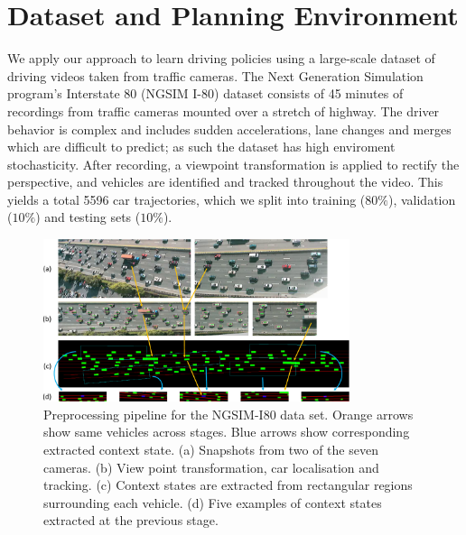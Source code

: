 \documentclass{article} %
\begin{document}
\section{Dataset and Planning Environment}
\label{dataset-and-planning}

We apply our approach to learn driving policies using a large-scale dataset of driving videos taken from traffic cameras.
The Next Generation Simulation program's Interstate 80 (NGSIM I-80) dataset \citep{NGSIM} consists of 45 minutes of recordings from traffic cameras mounted over a stretch of highway.
The driver behavior is complex and includes sudden accelerations, lane changes and merges which are difficult to predict; as such the dataset has high enviroment stochasticity.
After recording, a viewpoint transformation is applied to rectify the perspective, and vehicles are identified and tracked throughout the video.
This yields a total 5596 car trajectories, which we split into training ($80\%$), validation ($10\%$) and testing sets ($10\%$).

\begin{figure}[t]
  \centering
  \includegraphics[width=0.8\textwidth]{figures/driving/I-80-blue-crop.pdf}
  \caption{
    Preprocessing pipeline for the NGSIM-I80 data set.
    Orange arrows show same vehicles across stages.
    Blue arrows show corresponding extracted context state.
    (a) Snapshots from two of the seven cameras.
    (b) View point transformation, car localisation and tracking.
    (c) Context states are extracted from rectangular regions surrounding each vehicle.
    (d) Five examples of context states extracted at the previous stage.
  }
\label{I-80}
\end{figure}
\end{document}
